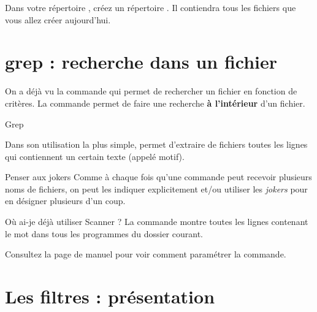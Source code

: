 \documentclass[a4paper,11pt]{style-esi/td}
\begin{document}
\entete
\titre
{}
\lastedit

\bigskip
\tableofcontents

\vfill
\begin{infobox}
    Dans votre répertoire , 
	créez un répertoire . 
    Il contiendra tous les fichiers que vous allez créer aujourd'hui. 
\end{infobox}
\vfill

\newpage

\section{grep : recherche dans un fichier}

	On a déjà vu la commande 
	qui permet de rechercher un fichier en fonction de critères.
	La commande  permet de faire une recherche 
	\textbf{à l'intérieur} d'un fichier.

	\begin{theorie}{Grep}

		\medskip
		Dans son utilisation la plus simple, 
		permet d’extraire de fichiers 
		toutes les lignes qui contiennent un certain texte 
		(appelé motif).
	\end{theorie}

	\begin{infotbox}{Penser aux jokers}
		Comme à chaque fois qu'une commande peut recevoir plusieurs noms de fichiers,
		on peut les indiquer explicitement et/ou utiliser les \emph{jokers}
		pour en désigner plusieurs d'un coup.
	\end{infotbox}

	\begin{Exemple}{Où ai-je déjà utiliser Scanner ?}
		La commande  montre toutes les lignes
		contenant le mot 
		dans tous les programmes  du dossier courant.
	\end{Exemple}

	Consultez la page de manuel pour voir comment paramétrer la commande.

\section{Les filtres : présentation}

\end{document}

